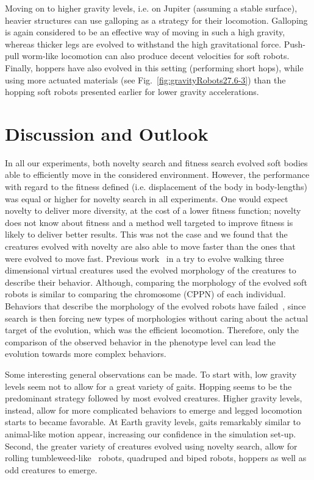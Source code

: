 \documentclass{sig-alternate}
\begin{document}
Moving on to higher gravity levels, i.e. on Jupiter (assuming a stable surface), heavier structures can use galloping as a strategy for their locomotion. Galloping is again considered to be an effective way of moving in such a high gravity, whereas thicker legs are evolved to withstand the high gravitational force. Push-pull worm-like locomotion can also produce decent velocities for soft robots. Finally, hoppers have also evolved in this setting (performing short hops), while using more actuated materials (see Fig.~\ref{fig:gravityRobots27.6-3}) than the hopping soft robots presented earlier for lower gravity accelerations.

\section{Discussion and Outlook}
In all our experiments, both novelty search and fitness search evolved soft bodies able to efficiently move in the considered environment. However, the performance with regard to the fitness defined (i.e. displacement of the body in body-lengths) was equal or higher for novelty search in all experiments. One would expect novelty to deliver more diversity, at the cost of a lower fitness function; novelty does not know about fitness and a method well targeted to improve fitness is likely to deliver better results. This was not the case and we found that the creatures evolved with novelty are also able to move faster than the ones that were evolved to move fast. Previous work~\cite{lehman2011evolving} in a try to evolve walking three dimensional virtual creatures used the evolved morphology of the creatures to describe their behavior. Although, comparing the morphology of the evolved soft robots is similar to comparing the chromosome (CPPN) of each individual. Behaviors that describe the morphology of the evolved robots have failed~\cite{lehman2011evolving}, since search is then forcing new types of morphologies without caring about the actual target of the evolution, which was the efficient locomotion. Therefore, only the comparison of the observed behavior in the phenotype level can lead the evolution towards more complex behaviors. 

Some interesting general observations can be made. To start with, low gravity levels seem not to allow for a great variety of gaits. Hopping seems to be the predominant strategy followed by most evolved creatures. Higher gravity levels, instead, allow for more complicated behaviors to emerge and legged locomotion starts to became favorable. At Earth gravity levels, gaits remarkably similar to animal-like motion appear, increasing our confidence in the simulation set-up. Second, the greater variety of creatures evolved using novelty search, allow for rolling tumbleweed-like~\cite{antol2003low} robots, quadruped and biped robots, hoppers as well as odd creatures to emerge. 
\end{document}
